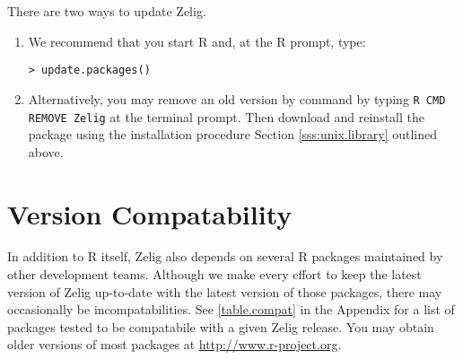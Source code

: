 There are two ways to update Zelig.  

\begin{enumerate}

\item We recommend that you start R and, at the R prompt, type:
\begin{verbatim}
> update.packages()
\end{verbatim}
  
\item Alternatively, you may remove an old version by command by
  typing {\tt R CMD REMOVE Zelig} at the terminal prompt.  Then
  download and reinstall the package using the installation
  procedure Section \ref{sss:unix.library} outlined above.

\end{enumerate}

\section{Version Compatability}

In addition to R itself, Zelig also depends on several R packages
maintained by other development teams.  Although we make every effort
to keep the latest version of Zelig up-to-date with the latest version
of those packages, there may occasionally be incompatabilities.  See
\ref{table.compat} in the Appendix for a list of packages tested to be
compatabile with a given Zelig release.  You may obtain older versions
of most packages at \url{http://www.r-project.org}.  

